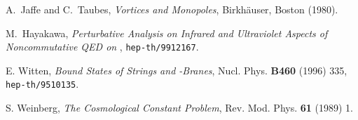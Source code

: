 \documentclass[a4paper,12pt]{article}
\begin{document}
\begin{thebibliography}{10}
 A.~Jaf\mbox{}fe and C.~Taubes, \textit{Vortices and Monopoles},
             Birkh\"auser, Boston (1980). 

 M.~Hayakawa, \textit{Perturbative Analysis on Infrared and
             Ultraviolet Aspects of Noncommutative QED on \coordHE{}},
             \texttt{hep-th/9912167}.

 E. Witten, \textit{Bound States of Strings and \coordHE{}-Branes},
             Nucl. Phys. {\bf B460} (1996) 335, \texttt{hep-th/9510135}.

 S. Weinberg, \textit{The Cosmological Constant Problem},
             Rev. Mod. Phys. {\bf 61} (1989) 1.

\end{thebibliography}
\end{document}
